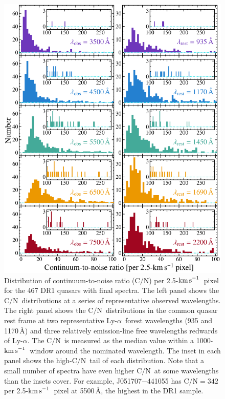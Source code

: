 \documentclass[fleqn,usenatbib,usedcolumn]{mnras}
\newcommand{\kms}{\ensuremath{\textrm{km\,s}^{-1}}}
\newcommand{\CN}{\ensuremath{\textrm{C/N}}}
\newcommand{\lya}{\ensuremath{\textrm{Ly-}\alpha}}
\begin{document}
\begin{figure}
\begin{center}
\includegraphics[width=0.95\columnwidth]{DR1_CNR.pdf}
\vspace{-1em}
\caption{Distribution of continuum-to-noise ratio (\CN) per 2.5-\kms\ pixel for the 467 DR1 quasars with final spectra. The left panel shows the \CN\ distributions at a series of representative observed wavelengths. The right panel shows the \CN\ distributions in the common quasar rest frame at two representative \lya\ forest wavelengths (935 and 1170\,\AA) and three relatively emission-line free wavelengths redwards of \lya. The \CN\ is measured as the median value within a 1000-\kms\ window around the nominated wavelength. The inset in each panel shows the high-\CN\ tail of each distribution. Note that a small number of spectra have even higher \CN\ at some wavelengths than the insets cover. For example, J051707$-$441055 has $\CN=342$ per 2.5-\kms\ pixel at 5500\,\AA, the highest in the DR1 sample.}
\label{f:cnr}
\end{center}
\end{figure}
\end{document}
